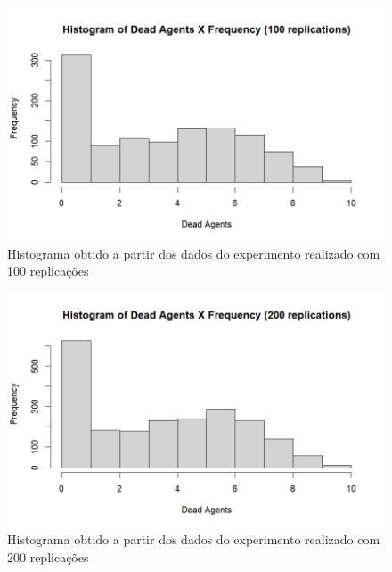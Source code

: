 \begin{figure}[H]
    \centering
    \includegraphics[angle=0,width=1\textwidth]{exploratory-data-analysis/seraphritt/PesqBibliogr/Virus-Network/Hist_100_repl.png}
    \caption{Histograma obtido a partir dos dados do experimento realizado com 100 replicações}
    \label{fig:seraphritt:hist2}
\end{figure}

\begin{figure}[H]
    \centering
    \includegraphics[angle=0,width=1\textwidth]{exploratory-data-analysis/seraphritt/PesqBibliogr/Virus-Network/Hist_200_repl.png}
    \caption{Histograma obtido a partir dos dados do experimento realizado com 200 replicações}
    \label{fig:seraphritt:hist3}
\end{figure}

